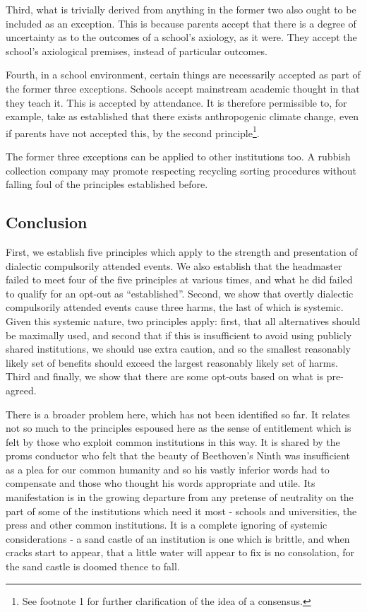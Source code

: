 \documentclass[12pt,a4paper]{report}
\begin{document}
\begin{multicols}{2}
\begin{multicols}{2}
Third, what is trivially derived from anything in the former two also
ought to be included as an exception. This is because parents accept
that there is a degree of uncertainty as to the outcomes of a school's
axiology, as it were. They accept the school's axiological premises,
instead of particular outcomes.

Fourth, in a school environment, certain things are necessarily accepted
as part of the former three exceptions. Schools accept mainstream
academic thought in that they teach it. This is accepted by attendance.
It is therefore permissible to, for example, take as established that
there exists anthropogenic climate change, even if parents have not
accepted this, by the second principle\footnote{See footnote 1 for
	further clarification of the idea of a consensus.}.

The former three exceptions can be applied to other institutions too. A
rubbish collection company may promote respecting recycling sorting
procedures without falling foul of the principles established before.

\subsection{Conclusion}\label{conclusion}

First, we establish five principles which apply to the strength and
presentation of dialectic compulsorily attended events. We also
establish that the headmaster failed to meet four of the five principles
at various times, and what he did failed to qualify for an opt-out as
``established''. Second, we show that overtly dialectic compulsorily
attended events cause three harms, the last of which is systemic. Given
this systemic nature, two principles apply: first, that all alternatives
should be maximally used, and second that if this is insufficient to
avoid using publicly shared institutions, we should use extra caution,
and so the smallest reasonably likely set of benefits should exceed the
largest reasonably likely set of harms. Third and finally, we show that
there are some opt-outs based on what is pre-agreed.

There is a broader problem here, which has not been identified so far.
It relates not so much to the principles espoused here as the sense of
entitlement which is felt by those who exploit common institutions in
this way. It is shared by the proms conductor who felt that the beauty
of Beethoven's Ninth was insufficient as a plea for our common humanity
and so his vastly inferior words had to compensate and those who thought
his words appropriate and utile. Its manifestation is in the growing
departure from any pretense of neutrality on the part of some of the
institutions which need it most - schools and universities, the press
and other common institutions. It is a complete ignoring of systemic
considerations - a sand castle of an institution is one which is
brittle, and when cracks start to appear, that a little water will
appear to fix is no consolation, for the sand castle is doomed thence to
fall.


\end{multicols}
\end{multicols}
\end{document}
